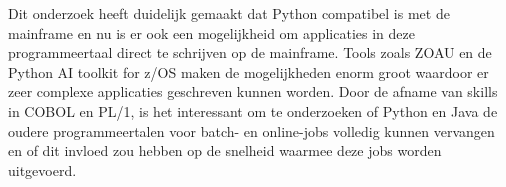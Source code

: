 Dit onderzoek heeft duidelijk gemaakt dat Python compatibel is met de mainframe en nu is er ook een mogelijkheid om applicaties in deze programmeertaal direct te schrijven op de mainframe. Tools zoals ZOAU en de Python AI toolkit for z/OS maken de mogelijkheden enorm groot waardoor er zeer complexe applicaties geschreven kunnen worden. Door de afname van skills in COBOL en PL/1, is het interessant om te onderzoeken of Python en Java de oudere programmeertalen voor batch- en online-jobs volledig kunnen vervangen en of dit invloed zou hebben op de snelheid waarmee deze jobs worden uitgevoerd.

